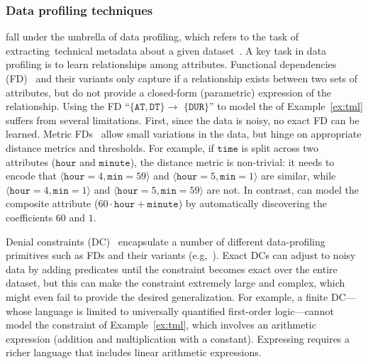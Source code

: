  \subsubsection*{Data profiling techniques} \Dis fall under the
umbrella of data profiling, which refers to the task of extracting~tech\-nical
metadata about a given dataset~\cite{DBLP:journals/vldb/AbedjanGN15}. A key
task in data profiling is to learn relationships among attributes. Functional
dependencies (FD)~\cite{papenbrock2015functional} and their variants only
capture if a relationship exists between two sets of attributes, but do not
provide a closed-form (parametric) expression of the relationship. Using the FD
``$\{\mathtt{AT}, \mathtt{DT}\} \rightarrow$ $\{\mathtt{DUR}\}$'' to model the
\invariant of Example~\ref{ex:tml} suffers from several limitations. First,
since the data is noisy, no exact FD can be learned. Metric
FDs~\cite{koudas2009metric} allow small variations in the data,
but hinge on appropriate distance metrics and thresholds. For example, if
$\mathtt{time}$ is split across two attributes ($\mathtt{hour}$ and
$\mathtt{minute}$), the distance metric is non-trivial: it needs to encode that
$\langle \mathtt{hour} = 4, \mathtt{min} = 59 \rangle$ and $\langle
\mathtt{hour} = 5, \mathtt{min} = 1\rangle$ are similar, while $\langle
\mathtt{hour} = 4, \mathtt{min} = 1\rangle$ and $\langle \mathtt{hour} = 5,
\mathtt{min} = 59\rangle$ are not. In contrast, \dis can model the composite
attribute ($60 \cdot \mathtt{hour} + \mathtt{minute}$) by automatically
discovering the coefficients $60$ and $1$.

 Denial constraints (DC)~\cite{DBLP:journals/pvldb/ChuIP13,
DBLP:journals/pvldb/BleifussKN17, pena2019discovery,
DBLP:journals/corr/abs-2005-08540} encapsulate a number of different
data-profiling primitives such as FDs and their variants (e.g,~\cite{
DBLP:conf/icde/FanGLX09}). Exact DCs can adjust to noisy data by adding
predicates until the constraint becomes exact over the entire dataset, but this
can make the constraint extremely large and complex, which might even fail to
provide the desired generalization. For example, a finite DC---whose language
is limited to universally quantified first-order logic---cannot model the
constraint of Example~\ref{ex:tml}, which involves an arithmetic expression
(addition and multiplication with a constant). Expressing \dis requires a
richer language that includes linear arithmetic expressions. 

